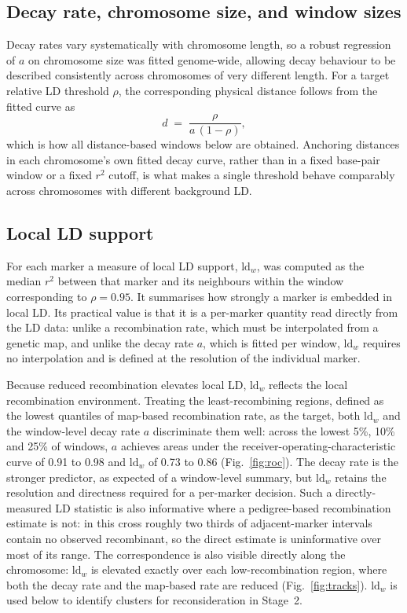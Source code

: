 \documentclass[11pt]{article}
\newcommand{\rsq}{\ensuremath{r^{2}}}
\begin{document}
\subsection{Decay rate, chromosome size, and window sizes}
Decay rates vary systematically with chromosome length, so a robust regression
of $a$ on chromosome size was fitted genome-wide, allowing decay behaviour to be
described consistently across chromosomes of very different length. For a target
relative LD threshold $\rho$, the corresponding physical distance follows from
the fitted curve as
\begin{equation}
d \;=\; \frac{\rho}{a\,(1-\rho)} ,
\end{equation}
which is how all distance-based windows below are obtained. Anchoring distances
in each chromosome's own fitted decay curve, rather than in a fixed base-pair
window or a fixed \rsq{} cutoff, is what makes a single threshold behave
comparably across chromosomes with different background LD.

\subsection{Local LD support}
For each marker a measure of local LD support, $\mathrm{ld}_w$, was computed as
the median \rsq{} between that marker and its neighbours within the window
corresponding to $\rho = 0.95$. It summarises how strongly a marker is embedded
in local LD. Its practical value is that it is a per-marker quantity read
directly from the LD data: unlike a recombination rate, which must be
interpolated from a genetic map, and unlike the decay rate $a$, which is fitted
per window, $\mathrm{ld}_w$ requires no interpolation and is defined at the
resolution of the individual marker.

Because reduced recombination elevates local LD, $\mathrm{ld}_w$ reflects the
local recombination environment. Treating the least-recombining regions,
defined as the lowest quantiles of map-based recombination rate, as the target,
both $\mathrm{ld}_w$ and the window-level decay rate $a$ discriminate them well:
across the lowest 5\%, 10\% and 25\% of windows, $a$ achieves areas under the
receiver-operating-characteristic curve of 0.91 to 0.98 and $\mathrm{ld}_w$ of
0.73 to 0.86 (Fig.~\ref{fig:roc}). The decay rate is the stronger predictor,
as expected of a window-level summary, but $\mathrm{ld}_w$ retains the
resolution and directness required for a per-marker decision. Such a
directly-measured LD statistic is also informative where a pedigree-based
recombination estimate is not: in this cross roughly two thirds of
adjacent-marker intervals contain no observed recombinant, so the direct
estimate is uninformative over most of its range. The correspondence is also
visible directly along the chromosome: $\mathrm{ld}_w$ is elevated exactly over
each low-recombination region, where both the decay rate and the map-based rate
are reduced (Fig.~\ref{fig:tracks}). $\mathrm{ld}_w$ is used below to identify
clusters for reconsideration in Stage~2.
\end{document}
